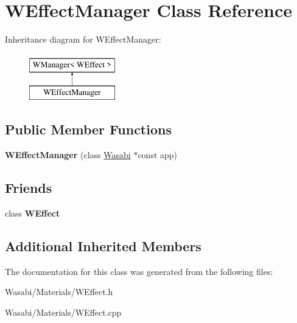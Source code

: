 \hypertarget{class_w_effect_manager}{}\section{W\+Effect\+Manager Class Reference}
\label{class_w_effect_manager}
Inheritance diagram for W\+Effect\+Manager\+:\begin{figure}[H]
\begin{center}
\leavevmode
\includegraphics[height=2.000000cm]{class_w_effect_manager}
\end{center}
\end{figure}
\subsection*{Public Member Functions}
\begin{DoxyCompactItemize}
\item 
{\bfseries W\+Effect\+Manager} (class \hyperlink{class_wasabi}{Wasabi} $\ast$const app)\hypertarget{class_w_effect_manager_ae065b7bb69af912cfa04d6fd120261c0}{}\label{class_w_effect_manager_ae065b7bb69af912cfa04d6fd120261c0}

\end{DoxyCompactItemize}
\subsection*{Friends}
\begin{DoxyCompactItemize}
\item 
class {\bfseries W\+Effect}\hypertarget{class_w_effect_manager_aa862ff89ea243967dcfdb12c12ad040b}{}\label{class_w_effect_manager_aa862ff89ea243967dcfdb12c12ad040b}

\end{DoxyCompactItemize}
\subsection*{Additional Inherited Members}


The documentation for this class was generated from the following files\+:\begin{DoxyCompactItemize}
\item 
Wasabi/\+Materials/W\+Effect.\+h\item 
Wasabi/\+Materials/W\+Effect.\+cpp\end{DoxyCompactItemize}
